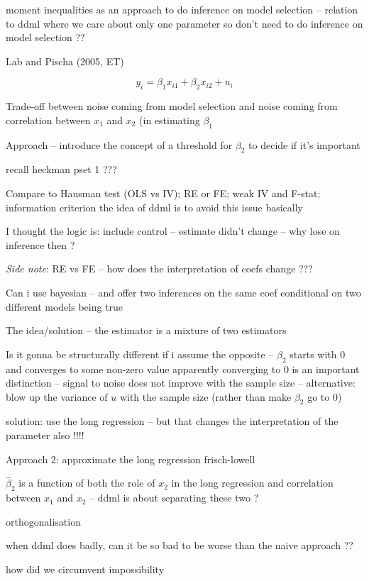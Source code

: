 \documentclass[a4paper,12pt,twoside]{article}
\begin{document}
moment inequalities as an approach to do inference on model selection -- relation to ddml where we care about only one parameter so don't need to do inference on model selection ??

Lab and Pischa (2005, ET)

\begin{equation}
	y_i = \beta_1 x_{i1} + \beta_2 x_{i2} + u_i
\end{equation}

Trade-off between noise coming from model selection and noise coming from correlation between $x_1$ and $x_2$ (in estimating $\beta_1$

Approach -- introduce the concept of a threshold for $\beta_2$ to decide if it's important

recall heckman pset 1 ???


Compare to Hausman test (OLS vs IV); RE or FE; weak IV and F-stat; information criterion
the idea of ddml is to avoid this issue basically


I thought the logic is: include control -- estimate didn't change -- why lose on inference then ?


\textit{Side note}: RE vs FE -- how does the interpretation of coefs change ???


Can i use bayesian -- and offer two inferences on the same coef conditional on two different models being true


The idea/solution -- the estimator is a mixture of two estimators


Is it gonna be structurally different if i assume the opposite -- $\beta_2$ starts with $0$ and converges to some non-zero value
apparently converging to $0$ is an important distinction -- signal to noise does not improve with the sample size -- alternative: blow up the variance of $u$ with the sample size (rather than make $\beta_2$ go to $0$)

solution: use the long regression -- but that changes the interpretation of the parameter also !!!!


Approach 2: approximate the long regression
frisch-lowell


$\hat \beta_2$ is a function of both the role of $x_2$ in the long regression and correlation between $x_1$ and $x_2$ -- ddml is about separating these two ?

orthogonalisation

when ddml does badly, can it be so bad to be worse than the naive approach ??

how did we circumvent impossibility
\end{document}
